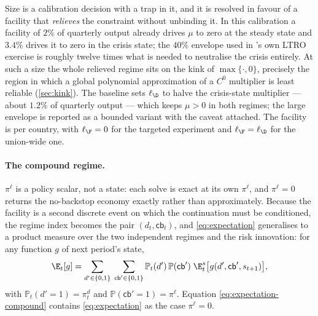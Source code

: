 Size is a calibration decision with a trap in it, and it is resolved in favour of
a facility that \emph{relieves} the constraint without unbinding it. In this
calibration a facility of $2\%$ of quarterly output already drives $\mu$ to zero
at the steady state and $3.4\%$ drives it to zero in the crisis state; the
$40\%$ envelope used in \citet{bocola2016pass}'s own LTRO exercise is roughly
twelve times what is needed to neutralise the crisis entirely. At such a size the
whole relieved regime sits on the kink of $\max\{\cdot,0\}$, precisely the region
in which a global polynomial approximation of a $C^0$ multiplier is least reliable
(\cref{sec:kink}). The baseline sets $\ell_\D$ to halve the crisis-state
multiplier --- about $1.2\%$ of quarterly output --- which keeps $\mu>0$ in both
regimes; the large envelope is reported as a bounded variant with the caveat
attached. The facility is per country, with $\ell_\F=0$ for the targeted
experiment and $\ell_\F=\ell_\D$ for the union-wide one.

\paragraph{The compound regime.} $\pi^{\ell}$ is a policy scalar, not a state:
each solve is exact at its own $\pi^{\ell}$, and $\pi^{\ell}=0$ returns the
no-backstop economy exactly rather than approximately. Because the facility is a
second discrete event on which the continuation must be conditioned, the regime
index becomes the pair $(d_t,\mathsf{cb}_t)$, and \eqref{eq:expectation}
generalises to a product measure over the two independent regimes and the risk
innovation: for any function $g$ of next period's state,
\begin{equation}
\E_t[g]=\sum_{d'\in\{0,1\}}\;\sum_{\mathsf{cb}'\in\{0,1\}}
   \mathbb{P}_t(d')\,\mathbb{P}(\mathsf{cb}')\;
   \E^{s}_t\bigl[g(d',\mathsf{cb}',s_{t+1})\bigr],
\label{eq:expectation-compound}
\end{equation}
with $\mathbb{P}_t(d'=1)=\pi^{d}_t$ and
$\mathbb{P}(\mathsf{cb}'=1)=\pi^{\ell}$. Equation
\eqref{eq:expectation-compound} contains \eqref{eq:expectation} as the case
$\pi^{\ell}=0$.


